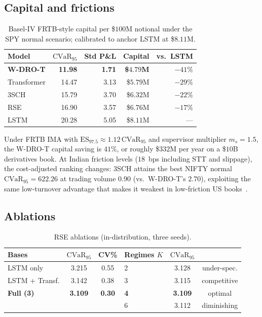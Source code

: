 \documentclass[11pt]{article}
\newcommand{\cvar}{\mathrm{CVaR}}
\begin{document}
\subsection{Capital and frictions}

\begin{table}[ht]\centering\small
\caption{Basel-IV FRTB-style capital per \$$100$M notional under the SPY normal scenario; calibrated to anchor LSTM at \$$8.11$M.}
\label{tab:capital}
\begin{tabular}{@{}lrrrr@{}}
\toprule
\textbf{Model} & \textbf{$\cvar_{95}$} & \textbf{Std P\&L} & \textbf{Capital} & \textbf{vs.\ LSTM} \\\midrule
\textbf{W-DRO-T} & \textbf{11.98} & \textbf{1.71} & \textbf{\$$4.79$M} & $-41\%$ \\
Transformer      & 14.47 & 3.13 & \$$5.79$M & $-29\%$ \\
3SCH             & 15.79 & 3.70 & \$$6.32$M & $-22\%$ \\
RSE              & 16.90 & 3.57 & \$$6.76$M & $-17\%$ \\
LSTM             & 20.28 & 5.05 & \$$8.11$M & --- \\
\bottomrule
\end{tabular}
\end{table}

Under FRTB IMA with $\mathrm{ES}_{97.5}\approx 1.12\,\cvar_{95}$ and supervisor multiplier $m_s=1.5$, the W-DRO-T capital saving is $41\%$, or roughly \$$332$M per year on a \$$10$B derivatives book.  At Indian friction levels ($18$~bps including STT and slippage), the cost-adjusted ranking changes: 3SCH attains the best NIFTY normal $\cvar_{95}=622.26$ at trading volume $0.90$ (vs.\ W-DRO-T's $2.70$), exploiting the same low-turnover advantage that makes it weakest in low-friction US books~\citep{leland1985option,whalley1997asymptotic}.

\subsection{Ablations}

\begin{table}[ht]\centering\small
\caption{RSE ablations (in-distribution, three seeds).}
\label{tab:rse_ablation}
\begin{tabular}{@{}lcc | lcc@{}}
\toprule
\textbf{Bases} & \textbf{$\cvar_{95}$} & \textbf{CV\%} & \textbf{Regimes $K$} & \textbf{$\cvar_{95}$} & \\\midrule
LSTM only         & 3.215 & 0.55 & 2  & 3.128 & under-spec. \\
LSTM + Transf.    & 3.142 & 0.38 & 3  & 3.115 & competitive  \\
\textbf{Full (3)} & \textbf{3.109} & \textbf{0.30} & \textbf{4} & \textbf{3.109} & optimal \\
                  &       &      & 6  & 3.112 & diminishing \\
\bottomrule
\end{tabular}
\end{table}
\end{document}
